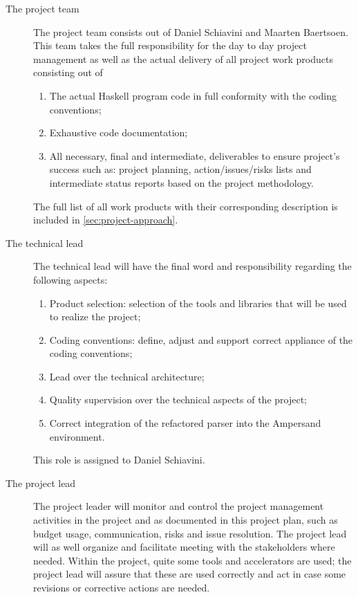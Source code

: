 \begin{description}
	\item[The project team]
	The project team consists out of Daniel Schiavini and Maarten Baertsoen.
	This team takes the full responsibility for the day to day project management as well as the actual delivery of all project work products consisting out of
	\begin{enumerate}
		\item The actual Haskell program code in full conformity with the coding conventions;
		\item Exhaustive code documentation;
		\item All necessary, final and intermediate, deliverables to ensure project's success such as: project planning, action/issues/risks lists and intermediate status reports based on the project methodology.
	\end {enumerate}
	The full list of all work products with their corresponding description is included in \autoref{sec:project-approach}.
	
	\item[The technical lead]
	The technical lead will have the final word and responsibility regarding the following aspects:
	\begin{enumerate}
		\item 	Product selection: selection of the tools and libraries that will be used to realize the project;
		\item 	Coding conventions: define, adjust and support correct  appliance of the coding conventions;
		\item 	Lead over the technical architecture;
		\item 	Quality supervision over the technical aspects of the project;
		\item 	Correct integration of the refactored parser into the Ampersand environment.
	\end {enumerate}
	This role is assigned to Daniel Schiavini.

	\item[The project lead]
	The project leader will monitor and control the project management activities in the project and as documented in this project plan, such as budget usage, communication, risks and issue resolution.
	 The project lead will as well organize and facilitate meeting with the stakeholders where needed. 
	Within the project, quite some tools and accelerators are used; the project lead will assure that these are used correctly and act in case some revisions or corrective actions are needed.


\end{description}
